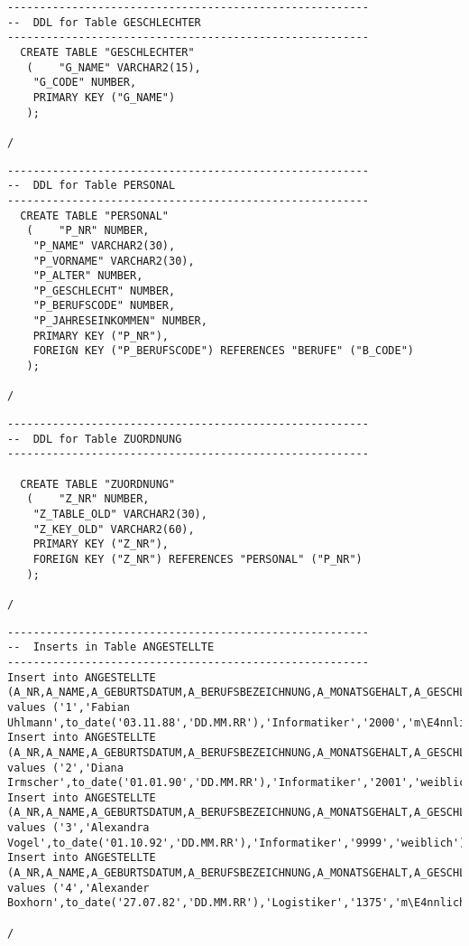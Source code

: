 \documentclass{scrartcl}
\begin{document}
\begin{lstlisting}
--------------------------------------------------------
--  DDL for Table GESCHLECHTER
--------------------------------------------------------
  CREATE TABLE "GESCHLECHTER" 
   (	"G_NAME" VARCHAR2(15), 
	"G_CODE" NUMBER,
	PRIMARY KEY ("G_NAME")
   );

/
\end{lstlisting}

\begin{lstlisting}
--------------------------------------------------------
--  DDL for Table PERSONAL
--------------------------------------------------------
  CREATE TABLE "PERSONAL" 
   (	"P_NR" NUMBER, 
	"P_NAME" VARCHAR2(30), 
	"P_VORNAME" VARCHAR2(30), 
	"P_ALTER" NUMBER, 
	"P_GESCHLECHT" NUMBER, 
	"P_BERUFSCODE" NUMBER, 
	"P_JAHRESEINKOMMEN" NUMBER,
	PRIMARY KEY ("P_NR"),
	FOREIGN KEY ("P_BERUFSCODE") REFERENCES "BERUFE" ("B_CODE")
   );

/
\end{lstlisting}

\begin{lstlisting}
--------------------------------------------------------
--  DDL for Table ZUORDNUNG
--------------------------------------------------------

  CREATE TABLE "ZUORDNUNG" 
   (	"Z_NR" NUMBER, 
	"Z_TABLE_OLD" VARCHAR2(30), 
	"Z_KEY_OLD" VARCHAR2(60),
	PRIMARY KEY ("Z_NR"),
	FOREIGN KEY ("Z_NR") REFERENCES "PERSONAL" ("P_NR")
   );

/
\end{lstlisting}

\begin{lstlisting}
--------------------------------------------------------
--  Inserts in Table ANGESTELLTE
--------------------------------------------------------
Insert into ANGESTELLTE (A_NR,A_NAME,A_GEBURTSDATUM,A_BERUFSBEZEICHNUNG,A_MONATSGEHALT,A_GESCHLECHT) values ('1','Fabian Uhlmann',to_date('03.11.88','DD.MM.RR'),'Informatiker','2000','m\E4nnlich');
Insert into ANGESTELLTE (A_NR,A_NAME,A_GEBURTSDATUM,A_BERUFSBEZEICHNUNG,A_MONATSGEHALT,A_GESCHLECHT) values ('2','Diana Irmscher',to_date('01.01.90','DD.MM.RR'),'Informatiker','2001','weiblich');
Insert into ANGESTELLTE (A_NR,A_NAME,A_GEBURTSDATUM,A_BERUFSBEZEICHNUNG,A_MONATSGEHALT,A_GESCHLECHT) values ('3','Alexandra Vogel',to_date('01.10.92','DD.MM.RR'),'Informatiker','9999','weiblich');
Insert into ANGESTELLTE (A_NR,A_NAME,A_GEBURTSDATUM,A_BERUFSBEZEICHNUNG,A_MONATSGEHALT,A_GESCHLECHT) values ('4','Alexander Boxhorn',to_date('27.07.82','DD.MM.RR'),'Logistiker','1375','m\E4nnlich');

/
\end{lstlisting}
\end{document}
